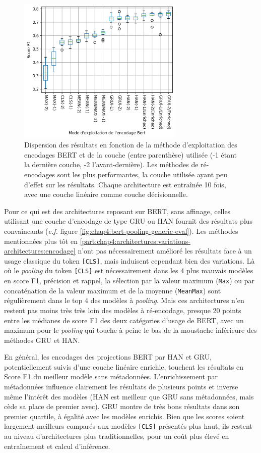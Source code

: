 \begin{figure}[ht]
    \centering
    \includegraphics[height=7cm]{figures/chap4/BertPoolingDetailed.png}
    \caption{Dispersion des résultats en fonction de la méthode d'exploitation des encodages BERT et de la couche (entre parenthèse) utilisée (-1 étant la dernière couche, -2 l'avant-dernière). Les méthodes de ré-encodages sont les plus performantes, la couche utilisée ayant peu d'effet sur les résultats. Chaque architecture est entraînée 10 fois, avec une couche linéaire comme couche décisionnelle.}
    \label{fig:chap4:bert-pooling-detailed-eval-fscore}
\end{figure}%

Pour ce qui est des architectures reposant sur BERT, sans affinage, celles utilisant une couche d'encodage de type GRU ou HAN fournit des résultats plus convaincants (\textit{c.f.} figure \ref{fig:chap4:bert-pooling-generic-eval}). Les méthodes mentionnées plus tôt en \ref{part:chap4:architectures:variations-architectures:encodage} n'ont pas nécessairement amélioré les résultats face à un usage classique du token \texttt{[CLS]}, mais induisent cependant bien des variations. Là où le \textit{pooling} du token \texttt{[CLS]} est nécessairement dans les 4 plus mauvais modèles en score F1, précision et rappel, la sélection par la valeur maximum (\texttt{Max}) ou par concaténation de la valeur maximum et de la moyenne (\texttt{MeanMax}) sont régulièrement dans le top 4 des modèles à \textit{pooling}. Mais ces architectures n'en restent pas moins très très loin des modèles à ré-encodage, presque 20 points entre les médianes de score F1 des deux catégories d'usage de BERT, avec un maximum pour le \textit{pooling} qui touche à peine le bas de la moustache inférieure des méthodes GRU et HAN.

En général, les encodages des projections BERT par HAN et GRU, potentiellement suivis d'une couche linéaire enrichie, touchent les résultats en Score F1 du meilleur modèle sans métadonnées. L'enrichissement par métadonnées influence clairement les résultats de plusieurs points et inverse même l'intérêt des modèles (HAN est meilleur que GRU sans métadonnées, mais cède sa place de premier avec). GRU montre de très bons résultats dans son premier quartile, à égalité avec les modèles enrichis. Bien que les scores soient largement meilleurs comparés aux modèles \texttt{[CLS]} présentés plus haut, ils restent au niveau d'architectures plus traditionnelles, pour un coût plus élevé en entraînement et calcul d'inférence.

